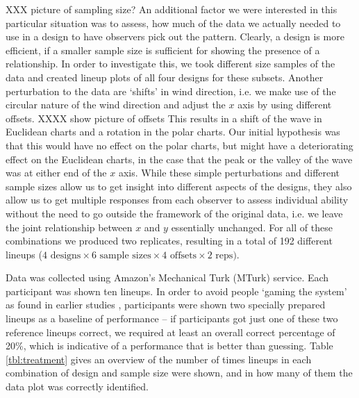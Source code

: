 XXX picture of sampling size?
An additional factor we were interested in this particular situation was to assess, how much of the data we actually needed to use in a design to have observers pick out the pattern. Clearly, a design is more efficient, if a smaller sample size is sufficient for showing the presence of a relationship. In order to investigate this, we took different size samples of the data and created lineup plots of all four designs for these subsets. Another perturbation to the data are `shifts' in wind direction, i.e. we make use of the circular nature of the wind direction and adjust the $x$ axis by using different offsets.
XXXX show picture of offsets
 This results in a shift of the wave in Euclidean charts and a rotation in the polar charts. Our initial hypothesis was that this would have no effect on the polar charts, but might have a deteriorating effect on the Euclidean charts, in the case that the peak or the valley of the wave was at either end of the $x$ axis. 
While these simple perturbations and different sample sizes allow us to get insight into different aspects of the designs, they also allow us to get multiple responses from each observer to assess individual ability without the need to go outside the framework of the original data, i.e. we leave the joint relationship between $x$ and $y$ essentially unchanged. For all of these combinations we produced two replicates, resulting in a total of 192 different lineups ($ 4 \text{ designs} \times 6 \text{ sample sizes} \times 4 \text{ offsets} \times 2 \text{ reps})$.

Data was collected using Amazon's Mechanical Turk (MTurk) service. Each participant was shown ten lineups. In order to avoid people `gaming the system' as found in earlier studies \cite{heer:2010, kosara:2010}, participants were shown two specially prepared lineups as a baseline of performance -- if participants got just one of these two reference lineups correct, we required at least an overall correct percentage of 20\%, which is indicative of a performance that is better than guessing. Table \ref{tbl:treatment} gives an overview of the number of times lineups in each combination of design and sample size were shown, and in how many of them the data plot was correctly identified. 

